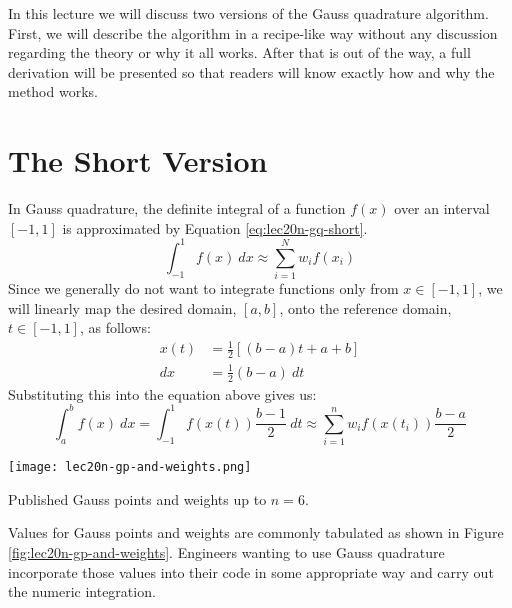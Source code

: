 In this lecture we will discuss two versions of the Gauss quadrature algorithm.  First, we will describe the algorithm in a recipe-like way without any discussion regarding the theory or why it all works.  After that is out of the way, a full derivation will be presented so that readers will know exactly how and why the method works.

\section{The Short Version}
In Gauss quadrature, the definite integral of a function $f(x)$ over an interval $[-1,1]$ is approximated by Equation \ref{eq:lec20n-gq-short}.
\begin{equation}
\int_{-1}^{1} f(x) \ dx \approx \sum\limits_{i=1}^{N}w_i f(x_i)
\label{eq:lec20n-gq-short}
\end{equation}
Since we generally do not want to integrate functions only from $x\in[-1,1]$, we will linearly map the desired domain, $[a,b]$, onto the reference domain, $t \in [-1,1]$, as follows:
\begin{align*}
x(t) &= \frac{1}{2}\left[(b-a)t + a + b \right] \\
dx &= \frac{1}{2}(b-a) \ dt
\end{align*}
Substituting this into the equation above gives us:
\begin{equation}
\int_{a}^{b}f(x) \ dx = \int_{-1}^{1}f(x(t))\frac{b-1}{2} \ dt \approx \sum\limits_{i=1}^{n}w_i f(x(t_i))\frac{b-a}{2}
\label{eq:lec20n-gp-formula}
\end{equation}

\begin{marginfigure}
\texttt{[image: lec20n-gp-and-weights.png]}
\caption{Published Gauss points and weights up to $n=6$.}
\label{fig:lec20n-gp-and-weights}
\end{marginfigure}
Values for Gauss points and weights are commonly tabulated as shown in Figure \ref{fig:lec20n-gp-and-weights}. Engineers wanting to use Gauss quadrature incorporate those values into their code in some appropriate way and carry out the numeric integration.

